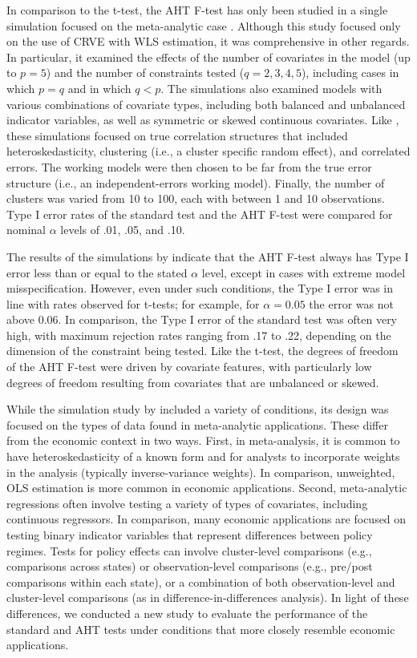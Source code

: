 \documentclass[draft]{ectaart}\usepackage[]{graphicx}\usepackage[]{color}
\begin{document}
In comparison to the t-test, the AHT F-test has only been studied in a single simulation focused on the meta-analytic case \citep{Tipton2015small-F}.
Although this study focused only on the use of CRVE with WLS estimation, it was comprehensive in other regards.
In particular, it examined the effects of the number of covariates in the model (up to $p = 5$) and the number of constraints tested ($q = 2,3,4,5$), including cases in which $p = q$ and in which $q < p$. 
The simulations also examined models with various combinations of covariate types, including both balanced and unbalanced indicator variables, as well as symmetric or skewed continuous covariates.
Like \citet{Tipton2015small-t}, these simulations focused on true correlation structures that included heteroskedasticity, clustering (i.e., a cluster specific random effect), and correlated errors.
The working models were then chosen to be far from the true error structure (i.e., an independent-errors working model).
Finally, the number of clusters was varied from 10 to 100, each with between 1 and 10 observations. 
Type I error rates of the standard test and the AHT F-test were compared for nominal $\alpha$ levels of .01, .05, and .10.

The results of the simulations by \citet{Tipton2015small-F} indicate that the AHT F-test always has Type I error less than or equal to the stated $\alpha$ level, except in cases with extreme model misspecification. 
However, even under such conditions, the Type I error was in line with rates observed for t-tests; for example, for $\alpha = 0.05$ the error was not above 0.06. 
In comparison, the Type I error of the standard test was often very high, with maximum rejection rates ranging from .17 to .22, depending on the dimension of the constraint being tested.
Like the t-test, the degrees of freedom of the AHT F-test were driven by covariate features, with particularly low degrees of freedom resulting from covariates that are unbalanced or skewed.

While the simulation study by \citet{Tipton2015small-F} included a variety of conditions, its design was focused on the types of data found in meta-analytic applications. 
These differ from the economic context in two ways.
First, in meta-analysis, it is common to have heteroskedasticity of a known form and for analysts to incorporate weights in the analysis (typically inverse-variance weights).
In comparison, unweighted, OLS estimation is more common in economic applications.
Second, meta-analytic regressions often involve testing a variety of types of covariates, including continuous regressors.
In comparison, many economic applications are focused on testing binary indicator variables that represent differences between policy regimes. 
Tests for policy effects can involve cluster-level comparisons (e.g., comparisons across states) or observation-level comparisons (e.g., pre/post comparisons within each state), or a combination of both observation-level and cluster-level comparisons (as in difference-in-differences analysis).
In light of these differences, we conducted a new study to evaluate the performance of the standard and AHT tests under conditions that more closely resemble economic applications. 
\end{document}

